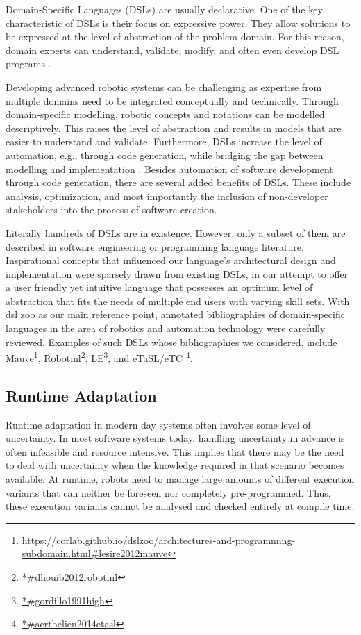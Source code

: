 \documentclass[conference]{IEEEtran}
\newcommand{\foot}[1]{\footnote{\url{#1}}}
\begin{document}
Domain-Specific Languages (DSLs) are usually declarative. One of the key characteristic of DSLs is their focus on expressive power. They allow solutions to be expressed at the level of abstraction of the problem domain. For this reason, domain experts can understand, validate, modify, and often even develop DSL programs \cite{dsl}.

Developing advanced robotic systems can be challenging as expertise from multiple domains need to be integrated conceptually and technically. Through domain-speciﬁc modelling, robotic concepts and notations can be modelled descriptively. This raises the level of abstraction and results in models that are easier to understand and validate. Furthermore, DSLs increase the level of automation, e.g., through code generation, while bridging the gap between modelling and implementation \cite{dsl-robo}. Besides automation of software development through code generation, there are several added benefits of DSLs. These include analysis, optimization, and most importantly the inclusion of non-developer stakeholders into the process of software creation.

Literally hundreds of DSLs are in existence. However, only a subset of them are described in software engineering or programming language literature. Inspirational concepts that influenced our language's architectural design and implementation were sparsely drawn from existing DSLs, in our attempt to offer a user friendly yet intuitive language that possesses an optimum level of abstraction that fits the needs of multiple end users with varying skill sets. With dsl zoo \cite{dsl-robo} as our main reference point, annotated bibliographies of domain-specific languages in the area of robotics and automation technology were carefully reviewed. Examples of such DSLs whose bibliographies we considered, include Mauve\foot{https://corlab.github.io/dslzoo/architectures-and-programming-subdomain.html#lesire2012mauve}, Robotml\foot{*#dhouib2012robotml}, LE\foot{*#gordillo1991high}, and eTaSL/eTC \foot{*#aertbelien2014etasl}.

\subsection{Runtime Adaptation}
Runtime adaptation in modern day systems often involves some level of uncertainty. In most software systems today, handling uncertainty in advance is often infeasible and resource intensive. This implies that there may be the need to deal with uncertainty when the knowledge required in that scenario becomes available. At runtime, robots need to manage large amounts of different execution variants that can neither be foreseen nor completely pre-programmed. Thus, these execution variants cannot be analysed and checked entirely at compile time.
\end{document}
